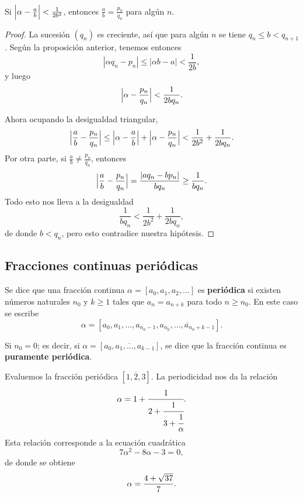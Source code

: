 \begin{corolario}
  \label{cor:mejor-aproximacion-por-pn/qn}
  Si $\Bigl|\alpha - \frac{a}{b}\Bigr| < \frac{1}{2b^2}$, entonces
  $\frac{a}{b} = \frac{p_n}{q_n}$ para algún $n$.

  \begin{proof}
    La sucesión $(q_n)$ es creciente, así que para algún $n$ se tiene
    $q_n \le b < q_{n+1}$. Según la proposición anterior, tenemos entonces
    $$|\alpha q_n - p_n| \le |\alpha b - a| < \frac{1}{2b},$$
    y luego
    $$\Bigl|\alpha - \frac{p_n}{q_n}\Bigr| < \frac{1}{2b q_n}.$$

    Ahora ocupando la desigualdad triangular,
    \[ \Bigl|\frac{a}{b} - \frac{p_n}{q_n}\Bigr| \le
       \Bigl|\alpha - \frac{a}{b}\Bigr| + \Bigl|\alpha - \frac{p_n}{q_n}\Bigr|
       < \frac{1}{2b^2} + \frac{1}{2b q_n}. \]
    Por otra parte, si $\frac{a}{b} \ne \frac{p_n}{q_n}$, entonces
    \[ \Bigl|\frac{a}{b} - \frac{p_n}{q_n}\Bigr| =
       \frac{|a q_n - b p_n|}{b q_n} \ge \frac{1}{b q_n}. \]
    Todo esto nos lleva a la desigualdad
    $$\frac{1}{b q_n} < \frac{1}{2b^2} + \frac{1}{2b q_n},$$
    de donde $b < q_n$, pero esto contradice nuestra hipótesis.
  \end{proof}
\end{corolario}

\subsection{Fracciones continuas periódicas}

\begin{definicion}
  Se dice que una fracción continua $\alpha = [a_0,a_1,a_2,\ldots]$ es
  \textbf{periódica} si existen números naturales $n_0$ y $k \ge 1$ tales que
  $a_n = a_{n+k}$ para todo $n \ge n_0$. En este caso se escribe
  $$\alpha = [a_0,a_1,\ldots,a_{n_0-1}, \overline{a_{n_0}, \ldots, a_{n_0+k-1}}].$$

  Si $n_0 = 0$; es decir, si $\alpha = [\overline{a_0,a_1,\ldots,a_{k-1}}]$,
  se dice que la fracción continua es \textbf{puramente periódica}.
\end{definicion}

\begin{ejemplo}
  Evaluemos la fracción periódica $[\overline{1,2,3}]$. La periodicidad nos da
  la relación
  $$\alpha = 1 + \cfrac{1}{2 + \cfrac{1}{3 + \cfrac{1}{\alpha}}}.$$
  Esta relación corresponde a la ecuación cuadrática
  $$7 \alpha^2 - 8\alpha - 3 = 0,$$
  de donde se obtiene
  \[ \alpha = \frac{4 + \sqrt{37}}{7}. \qedhere \]
\end{ejemplo}

